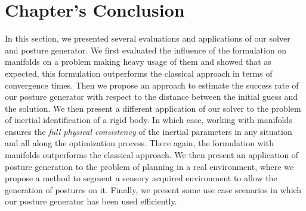 \section{Chapter's Conclusion}
\label{sec:conclusion_chap_6}

In this section, we presented several evaluations and applications of our solver and posture generator.
We first evaluated the influence of the formulation on manifolds on a problem making heavy usage of them and showed that as expected, this formulation outperforms the classical approach in terms of convergence times.
Then we propose an approach to estimate the success rate of our posture generator with respect to the distance between the initial guess and the solution.
We then present a different application of our solver to the problem of inertial identification of a rigid body.
In which case, working with manifolds ensures the \emph{full physical consistency} of the inertial parameters in any situation and all along the optimization process.
There again, the formulation with manifolds outperforms the classical approach.
We then present an application of posture generation to the problem of planning in a real environment, where we propose a method to segment a sensory acquired environment to allow the generation of postures on it.
Finally, we present some use case scenarios in which our posture generator has been used efficiently.
